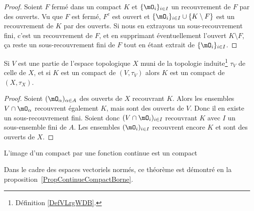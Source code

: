\begin{proof}

    Soient \( F\) fermé dans un compact \( K\) et \( \{ \mO_i \}_{i\in I}\) un recouvrement de \( F\) par des ouverts. Vu que \( F\) est fermé, \( F^c\) est ouvert et \( \{ \mO_i \}_{i\in I}\cup\{ K\setminus F \}\) est un recouvrement de \( K\) par des ouverts. Si nous en extrayons un sous-recouvrement fini, c'est un recouvrement de \( F\), et en supprimant éventuellement l'ouvert \( K\setminus F\), ça reste un sous-recouvrement fini de \( F\) tout en étant extrait de \( \{ \mO_i \}_{i\in I}\).
\end{proof}

\begin{proposition}     \label{PropGBZUooRKaOxy}
    Si \( V\) est une partie de l'espace topologique \( X\) muni de la topologie induite\footnote{Définition \ref{DefVLrgWDB}.} \( \tau_V\) de celle de \( X\), et si \( K\) est un compact de \( (V,\tau_V)\) alors \( K\) est un compact de \( (X,\tau_X)\).
\end{proposition}

\begin{proof}
    Soient \(   (\mO_\alpha)_{\alpha\in A}  \) des ouverts de \( X\) recouvrant \( K\). Alors les ensembles \( V\cap \mO_{\alpha}\) recouvrent également \( K\), mais sont des ouverts de \( V\). Donc il en existe un sous-recouvrement fini. Soient donc \( (V\cap\mO_i)_{i\in I}\) recouvrant \( K\) avec \( I\) un sous-ensemble fini de \( A\). Les ensembles \( (\mO_i)_{i\in I}\) recouvrent encore \( K\) et sont des ouverts de \( X\).
\end{proof}

\begin{theorem}     \label{ThoImCompCotComp}
L'image d'un compact par une fonction continue est un compact
\end{theorem}
Dans le cadre des espaces vectoriels normés, ce théorème est démontré en la proposition~\ref{PropContinueCompactBorne}.

